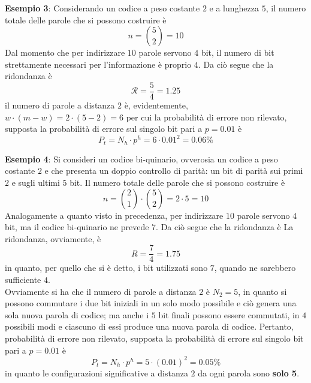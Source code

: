 \documentclass[a4paper]{extarticle}
\begin{document}
\vspace{1em}
\noindent
\textbf{Esempio 3}: Considerando un codice a peso costante $2$ e a lunghezza $5$, il numero totale delle parole che si possono costruire è
\[n=\binom{5}{2}=10\]
Dal momento che per indirizzare $10$ parole servono $4$ bit, il numero di bit strettamente necessari per l'informazione è proprio $4$. Da ciò segue che la ridondanza è
\[\mathcal{R}=\frac{5}{4}=1.25\]
il numero di parole a distanza $2$ è, evidentemente,
$w \cdot (m-w) = 2 \cdot (5-2)=6$
per cui la probabilità di errore non rilevato, supposta la probabilità di errore sul singolo bit pari a $p=0.01$ è
\[P_t=N_h \cdot p^h=6 \cdot 0.01^2=0.06\%\]

\vspace{1em}
\noindent
\textbf{Esempio 4}: Si consideri un codice bi-quinario, ovverosia un codice a peso costante $2$ e che presenta un doppio controllo di parità: un bit di parità sui primi $2$ e sugli ultimi $5$ bit. Il numero totale delle parole che si possono costruire è
\[n=\binom{2}{1} \cdot \binom{5}{2} = 2 \cdot 5 = 10\]
Analogamente a quanto visto in precedenza, per indirizzare $10$ parole servono $4$ bit, ma il codice bi-quinario ne prevede $7$. Da ciò segue che la ridondanza è
La ridondanza, ovviamente, è
\[R=\frac{7}{4}=1.75\]
in quanto, per quello che si è detto, i bit utilizzati sono $7$, quando ne sarebbero sufficiente $4$.\\
Ovviamente si ha che il numero di parole a distanza $2$ è $N_2=5$, in quanto si possono commutare i due bit iniziali in un solo modo possibile e ciò genera una sola nuova parola di codice; ma anche i $5$ bit finali possono essere commutati, in $4$ possibili modi e ciascuno di essi produce una nuova parola di codice. Pertanto, probabilità di errore non rilevato, supposta la probabilità di errore sul singolo bit pari a $p=0.01$ è
\[P_t = N_h \cdot p^h = 5 \cdot (0.01)^2 = 0.05 \%\]
in quanto le configurazioni significative a distanza $2$ da ogni parola sono \textbf{solo 5}.
\end{document}
